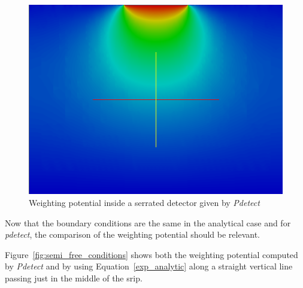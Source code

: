 \documentclass[11pt]{article}
\begin{document}
		\begin{figure}[H]
			\center
			\includegraphics[scale=0.4]{images/boundary_conditions/detector/w_semi_free_conditions.png}
			\caption{Weighting potential inside a serrated detector given by \textit{Pdetect}}
			\label{fig:w_semi_free_conditions}
		\end{figure}

		Now that the boundary conditions are the same in the analytical case and for \textit{pdetect},
		the comparison of the weighting potential should be relevant.

		Figure~\ref{fig:semi_free_conditions} shows both the weighting potential computed by \textit{Pdetect}
		and by using Equation~\ref{exp_analytic} along a straight vertical line passing just in the middle of
		the srip.
\end{document}
